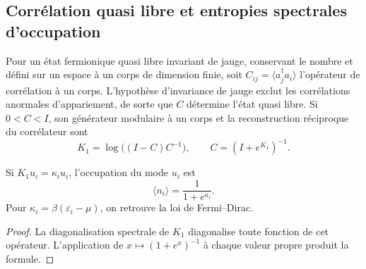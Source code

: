 \subsection{Corrélation quasi libre et entropies spectrales d’occupation}
\label{v:rec:cuasilibre:section:01}

Pour un état fermionique quasi libre invariant de jauge, conservant le
nombre et défini sur un espace à un corps de dimension finie, soit
\(C_{ij}=\langle a_j^\dagger a_i\rangle\) l’opérateur de corrélation à un
corps. L’hypothèse d’invariance de jauge exclut les corrélations anormales
d’appariement, de sorte que \(C\) détermine l’état quasi libre. Si
\(0<C<I\), son générateur modulaire à un corps et la reconstruction réciproque
du corrélateur sont
\begin{equation}
 \boxed{
 K_1=\log\bigl((I-C)C^{-1}\bigr),
 \qquad
 C=(I+e^{K_1})^{-1}.}
 \label{v:rec:eq:puente-cuasilibre-modular-rev3}
\end{equation}

\begin{corollary}
\label{v:rec:cor:forma-logistica-modular-rev3}
Si \(K_1u_i=\kappa_i u_i\), l’occupation du mode \(u_i\) est
\[
 \langle n_i\rangle=\frac1{1+e^{\kappa_i}}.
\]
Pour \(\kappa_i=\beta(\varepsilon_i-\mu)\), on retrouve la loi de
Fermi--Dirac.
\end{corollary}

\begin{proof}
La diagonalisation spectrale de \(K_1\) diagonalise toute fonction de cet opérateur.
L’application de \(x\mapsto(1+e^x)^{-1}\) à chaque valeur propre produit la formule.
\end{proof}

